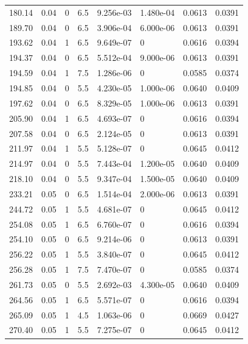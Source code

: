 \documentclass[preview]{standalone}
\begin{document}
{{{\begin{tabular}{L{1.2cm}C{1.2cm} C{0.3cm}C{0.5cm} C{1.4cm}C{1.4cm} C{1.4cm}C{1.4cm}}
  180.14  &  0.04  & 0     & 6.5 &  9.256e-03  & 1.480e-04  & 0.0613 &  0.0391   \\ 
  189.70  &  0.04  & 0     & 6.5 &  3.906e-04  & 6.000e-06  & 0.0613 &  0.0391   \\ 
  193.62  &  0.04  & 1     & 6.5 &  9.649e-07  & 0  & 0.0616 &  0.0394   \\ 
  194.37  &  0.04  & 0     & 6.5 &  5.512e-04  & 9.000e-06  & 0.0613 &  0.0391   \\ 
  194.59  &  0.04  & 1     & 7.5 &  1.286e-06  & 0  & 0.0585 &  0.0374   \\ 
  194.85  &  0.04  & 0     & 5.5 &  4.230e-05  & 1.000e-06  & 0.0640 &  0.0409   \\ 
  197.62  &  0.04  & 0     & 6.5 &  8.329e-05  & 1.000e-06  & 0.0613 &  0.0391   \\ 
  205.90  &  0.04  & 1     & 6.5 &  4.693e-07  & 0  & 0.0616 &  0.0394   \\ 
  207.58  &  0.04  & 0     & 6.5 &  2.124e-05  & 0  & 0.0613 &  0.0391   \\ 
  211.97  &  0.04  & 1     & 5.5 &  5.128e-07  & 0  & 0.0645 &  0.0412   \\ 
  214.97  &  0.04  & 0     & 5.5 &  7.443e-04  & 1.200e-05  & 0.0640 &  0.0409   \\ 
  218.10  &  0.04  & 0     & 5.5 &  9.347e-04  & 1.500e-05  & 0.0640 &  0.0409   \\ 
  233.21  &  0.05  & 0     & 6.5 &  1.514e-04  & 2.000e-06  & 0.0613 &  0.0391   \\ 
  244.72  &  0.05  & 1     & 5.5 &  4.681e-07  & 0  & 0.0645 &  0.0412   \\ 
  254.08  &  0.05  & 1     & 6.5 &  6.760e-07  & 0  & 0.0616 &  0.0394   \\ 
  254.10  &  0.05  & 0     & 6.5 &  9.214e-06  & 0  & 0.0613 &  0.0391   \\ 
  256.22  &  0.05  & 1     & 5.5 &  3.840e-07  & 0  & 0.0645 &  0.0412   \\ 
  256.28  &  0.05  & 1     & 7.5 &  7.470e-07  & 0  & 0.0585 &  0.0374   \\ 
  261.73  &  0.05  & 0     & 5.5 &  2.692e-03  & 4.300e-05  & 0.0640 &  0.0409   \\ 
  264.56  &  0.05  & 1     & 6.5 &  5.571e-07  & 0  & 0.0616 &  0.0394   \\ 
  265.09  &  0.05  & 1     & 4.5 &  1.063e-06  & 0  & 0.0669 &  0.0427   \\ 
  270.40  &  0.05  & 1     & 5.5 &  7.275e-07  & 0  & 0.0645 &  0.0412   \\ 

\end{tabular}}}}
\end{document}
